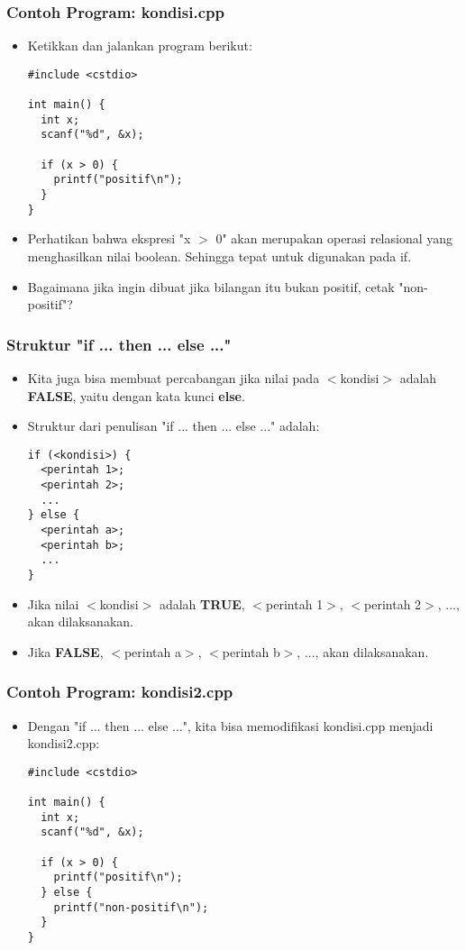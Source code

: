 \begin{frame}[fragile]
\frametitle{Contoh Program: kondisi.cpp}
\begin{itemize}
  \item Ketikkan dan jalankan program berikut:
\begin{lstlisting}
#include <cstdio>

int main() {
  int x;
  scanf("%d", &x);

  if (x > 0) {
    printf("positif\n");
  }
}
\end{lstlisting}
  \item Perhatikan bahwa ekspresi "x $>$ 0" akan merupakan operasi relasional yang menghasilkan nilai boolean. Sehingga tepat untuk digunakan pada if.
  \item Bagaimana jika ingin dibuat jika bilangan itu bukan positif, cetak "non-positif"?
\end{itemize}
\end{frame}

\begin{frame}[fragile]
\frametitle{Struktur "if ... then ... else ..."}
\begin{itemize}
  \item Kita juga bisa membuat percabangan jika nilai pada $<$kondisi$>$ adalah \textbf{FALSE}, yaitu dengan kata kunci \textbf{else}.
  \item Struktur dari penulisan "if ... then ... else ..." adalah:
\begin{lstlisting}
if (<kondisi>) {
  <perintah 1>;
  <perintah 2>;
  ...
} else {
  <perintah a>;
  <perintah b>;
  ...
}
\end{lstlisting}

  \item Jika nilai $<$kondisi$>$ adalah \textbf{TRUE}, $<$perintah 1$>$, $<$perintah 2$>$, ..., akan dilaksanakan.
  \item Jika \textbf{FALSE}, $<$perintah a$>$, $<$perintah b$>$, ..., akan dilaksanakan.
\end{itemize}
\end{frame}

\begin{frame}[fragile]
\frametitle{Contoh Program: kondisi2.cpp}
\begin{itemize}
  \item Dengan "if ... then ... else ...", kita bisa memodifikasi kondisi.cpp menjadi kondisi2.cpp:
\begin{lstlisting}
#include <cstdio>

int main() {
  int x;
  scanf("%d", &x);

  if (x > 0) {
    printf("positif\n");
  } else {
    printf("non-positif\n");
  }
}
\end{lstlisting}
\end{itemize}
\end{frame}

